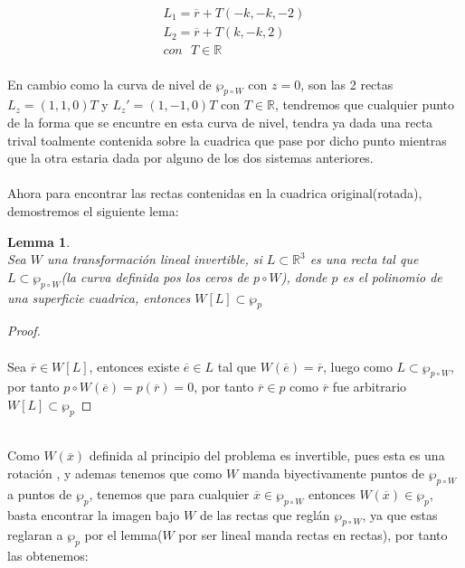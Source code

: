 \documentclass[11pt,letterpaper]{article}
\newtheorem{lemma}[theorem]{Lemma}
\newcommand{\R}{\mathbb{R}}
\begin{document}
        \begin{align*}
            L_1=\overline{r}+T(-k,-k,-2)\,\\
            L_2=\overline{r}+T(k,-k,2)\,\\
            con\,\,\,\,T\in \R
        \end{align*}\,\\
        En cambio como la curva de nivel de $\wp_{p\circ W}$ con $z=0$, son las 2 rectas $L_z=(1,1,0)T$ y $L_{z}'=(1,-1,0)T$ con $T\in \R$, tendremos que cualquier punto
        de la forma que se encuntre en esta curva de nivel, tendra ya dada una recta trival toalmente contenida sobre la cuadrica que pase por dicho punto
        mientras que la otra estaria dada por alguno de los dos sistemas anteriores.\,\\
        \,\\
        Ahora para encontrar las rectas contenidas en la cuadrica original(rotada), demostremos el siguiente lema:\,\\
        \begin{lemma}\,\\
            Sea $W$ una transformaci\'on lineal invertible, si $L\subset \R^3$ es una recta tal que $L\subset \wp_{p\circ W}$(la curva definida pos los ceros de $p\circ W$), donde $p$ es el polinomio de una superficie cuadrica, entonces $W[L]\subset \wp_{p}$ 
        \end{lemma}
        \begin{proof}\,\\
            \,\\
            Sea $\overline{r}\in W[L]$, entonces existe $\overline{e}\in L$ tal que $W(\overline{e})=\overline{r}$, luego como $L\subset\wp_{ p\circ W}$, por tanto $p\circ W(\overline{e})=p(\overline{r})=0$, por tanto
            $\overline{r}\in p$ como $\overline r$ fue arbitrario $W[L]\subset \wp_{p}$
        \end{proof}\,\\
        Como $W(\overline{x})$ definida al principio del problema es invertible, pues esta es una rotaci\'on , y ademas tenemos que como $W$ manda biyectivamente puntos de $\wp_{p\circ W}$ a puntos de $\wp_{p}$, tenemos que para cualquier $\overline{x}\in \wp_{p\circ W}$ entonces
        $W(\overline{x})\in \wp_{p}$, basta encontrar la imagen bajo $W$ de las rectas que regl\'an $\wp_{p\circ W}$, ya que estas reglaran a $\wp_{p}$ por el lemma($W$ por ser lineal manda rectas en rectas), por tanto las obtenemos:\,\\
        \,\\
\end{document}
